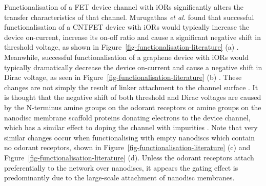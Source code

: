 \documentclass[
  a4paper,
]{scrbook}
\begin{document}
Functionalisation of a FET device channel with iORs significantly alters
the transfer characteristics of that channel. Murugathas \emph{et al.}
found that successful functionalisation of a CNTFET device with iORs
would typically increase the device on-current, increase its on-off
ratio and cause a significant negative shift in threshold voltage, as
shown in Figure~\ref{fig-functionalisation-literature} (a)
\autocite{Murugathas2019a}. Meanwhile, successful functionalisation of a
graphene device with iORs would typically dramatically decrease the
device on-current and cause a negative shift in Dirac voltage, as seen
in Figure~\ref{fig-functionalisation-literature} (b)
\autocite{Murugathas2020}. These changes are not simply the result of
linker attachment to the channel surface \autocite{Murugathas2019a}. It
is thought that the negative shift of both threshold and Dirac voltages
are caused by the N-terminus amine groups on the odorant receptors or
amine groups on the nanodisc membrane scaffold proteins donating
electrons to the device channel, which has a similar effect to doping
the channel with impurities
\autocite{Bradley2004,Murugathas2019a,Murugathas2020}. Note that very
similar changes occur when functionalising with empty nanodiscs which
contain no odorant receptors, shown in
Figure~\ref{fig-functionalisation-literature} (c) and
Figure~\ref{fig-functionalisation-literature} (d). Unless the odorant
receptors attach preferentially to the network over nanodiscs, it
appears the gating effect is predominantly due to the large-scale
attachment of nanodisc membranes.
\end{document}
